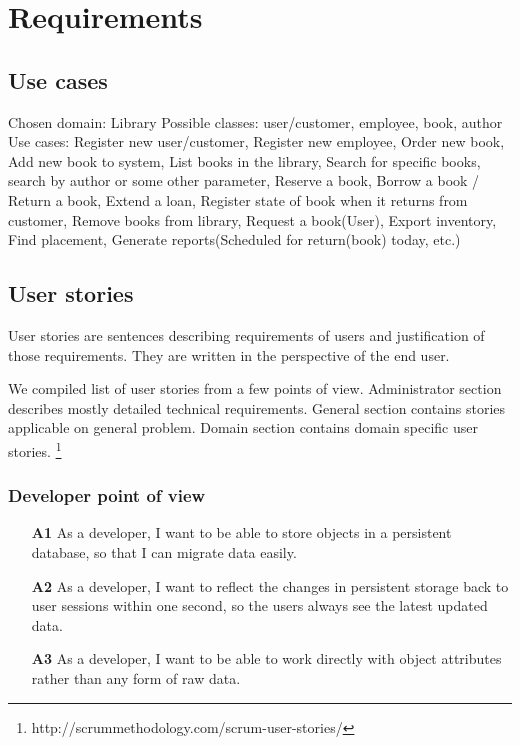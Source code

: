 \chapter{Requirements}
\section{Use cases}
Chosen domain: Library
Possible classes: user/customer, employee, book, author
Use cases: Register new user/customer, Register new employee, Order new book, Add new book to system, List books in the library, Search for specific books, search by author or some other parameter, Reserve a book, Borrow a book / Return a book, Extend a loan, Register state of book when it returns from customer, Remove books from library, Request a book(User), Export inventory, Find placement, Generate reports(Scheduled for return(book) today, etc.)

\section{User stories}
User stories are sentences describing requirements of users and justification of those requirements. They are written in the perspective of the end user.


We compiled list of user stories from a few points of view. Administrator section describes mostly detailed technical requirements. General section contains stories applicable on general problem. Domain section contains domain specific user stories. \footnote{http://scrummethodology.com/scrum-user-stories/}

\subsection*{Developer point of view}
\begin{itemize}
  \item [\textbf{A1}] As a developer, I want to be able to store objects in a persistent database, so that I can migrate data easily.
  \item [\textbf{A2}] As a developer, I want to reflect the changes in persistent storage back to user sessions within one second, so the users always see the latest updated data.
  \item [\textbf{A3}] As a developer, I want to be able to work directly with object attributes rather than any form of raw data.
\end{itemize}

